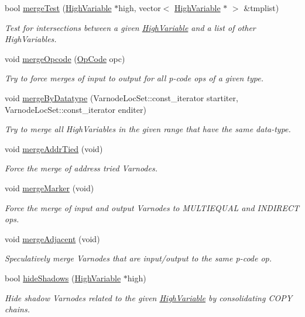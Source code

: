 \begin{DoxyCompactItemize}
bool \mbox{\hyperlink{class_merge_a819c900aaa428a745faa59335bf0b69e}{merge\+Test}} (\mbox{\hyperlink{class_high_variable}{High\+Variable}} $\ast$high, vector$<$ \mbox{\hyperlink{class_high_variable}{High\+Variable}} $\ast$ $>$ \&tmplist)
\begin{DoxyCompactList}\small\item\em Test for intersections between a given \mbox{\hyperlink{class_high_variable}{High\+Variable}} and a list of other High\+Variables. \end{DoxyCompactList}\item 
void \mbox{\hyperlink{class_merge_a55762a93af96a7e8abab70b169302b59}{merge\+Opcode}} (\mbox{\hyperlink{opcodes_8hh_abeb7dfb0e9e2b3114e240a405d046ea7}{Op\+Code}} opc)
\begin{DoxyCompactList}\small\item\em Try to force merges of input to output for all p-\/code ops of a given type. \end{DoxyCompactList}\item 
void \mbox{\hyperlink{class_merge_a319ac2d65a6dff86cbfda772d047b2e1}{merge\+By\+Datatype}} (Varnode\+Loc\+Set\+::const\+\_\+iterator startiter, Varnode\+Loc\+Set\+::const\+\_\+iterator enditer)
\begin{DoxyCompactList}\small\item\em Try to merge all High\+Variables in the given range that have the same data-\/type. \end{DoxyCompactList}\item 
void \mbox{\hyperlink{class_merge_a8045c24ce73080b02d4506f2047a414e}{merge\+Addr\+Tied}} (void)
\begin{DoxyCompactList}\small\item\em Force the merge of {\itshape address} {\itshape tried} Varnodes. \end{DoxyCompactList}\item 
void \mbox{\hyperlink{class_merge_aedcf63d8d5400410d06ef4aa250275a1}{merge\+Marker}} (void)
\begin{DoxyCompactList}\small\item\em Force the merge of input and output Varnodes to M\+U\+L\+T\+I\+E\+Q\+U\+AL and I\+N\+D\+I\+R\+E\+CT ops. \end{DoxyCompactList}\item 
void \mbox{\hyperlink{class_merge_a79f377000da91c9e50b89307fa88d268}{merge\+Adjacent}} (void)
\begin{DoxyCompactList}\small\item\em Speculatively merge Varnodes that are input/output to the same p-\/code op. \end{DoxyCompactList}\item 
bool \mbox{\hyperlink{class_merge_abb1f01b80297db3a5c37c9860af56162}{hide\+Shadows}} (\mbox{\hyperlink{class_high_variable}{High\+Variable}} $\ast$high)
\begin{DoxyCompactList}\small\item\em Hide {\itshape shadow} Varnodes related to the given \mbox{\hyperlink{class_high_variable}{High\+Variable}} by consolidating C\+O\+PY chains. \end{DoxyCompactList}\end{DoxyCompactItemize}


